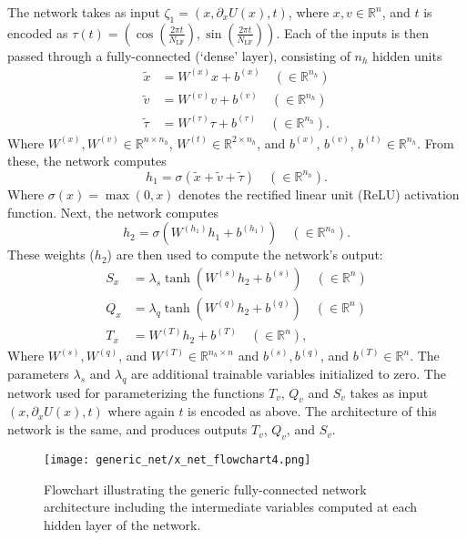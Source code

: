 \documentclass[main.tex]{subfiles}
\begin{document}
The network takes as input $\zeta_1 = (x, \partial_{x} U(x), t)$, where $x, v \in \mathbb{R}^{n}$, and $t$ is encoded
as $\tau(t) = \left(\cos{(\frac{2\pi t}{N_{\mathrm{LF}}})},\right.  \left.\sin{(\frac{2\pi
t}{N_{\mathrm{LF}}})}\right)$.
%
Each of the inputs is then passed through a fully-connected (`dense' layer), consisting of $n_h$ hidden units
%
\begin{align}
    \tilde x &= W^{(x)} x + b^{(x)} \quad (\in \mathbb{R}^{n_h})\\
    \tilde v &= W^{(v)} v + b^{(v)} \quad (\in \mathbb{R}^{n_h})\\
    \tilde \tau &= W^{(\tau)} \tau + b^{(\tau)} \quad (\in \mathbb{R}^{n_h}).
\end{align}
%
Where $W^{(x)}, W^{(v)} \in \mathbb{R}^{n \times n_h}$, $W^{(t)} \in \mathbb{R}^{2 \times n_h}$, and $b^{(x)}$,
$b^{(v)}$,  $b^{(t)} \in \mathbb{R}^{n_h}$.
%
From these, the network computes
%
\begin{equation}
    h_1 = \sigma(\tilde x + \tilde v + \tilde \tau) \quad (\in
    \mathbb{R}^{n_h}).
    \label{eq:hidden_1}
\end{equation}
%
Where $\sigma(x) = \max(0, x)$ denotes the rectified linear unit (ReLU) activation function.
%
Next, the network computes
%
\begin{equation}
    h_2 = \sigma\left(W^{(h_1)} h_1 + b^{(h_1)}\right) \quad (\in
    \mathbb{R}^{n_h}).
    \label{eq:hidden_2}
\end{equation}
%
These weights ($h_2$) are then used to compute the network's output:
%
\begin{align}
    S_x &= \lambda_s \tanh(W^{(s)} h_2 + b^{(s)})\quad (\in \mathbb{R}^{n})\\
    Q_x &= \lambda_q \tanh(W^{(q)} h_2 + b^{(q)})\quad (\in \mathbb{R}^{n})\\
    T_x &= W^{(T)} h_2 + b^{(T)}\quad (\in \mathbb{R}^{n}),
\end{align}
%
Where $W^{(s)}, W^{(q)}$, and $W^{(T)} \in \mathbb{R}^{n_h \times n}$ and $b^{(s)}, b^{(q)}$, and $b^{(T)} \in
\mathbb{R}^{n}$.
%
The parameters $\lambda_s$ and $\lambda_q$ are additional trainable variables initialized to zero.
%
The network used for parameterizing the functions $T_v$, $Q_v$ and $S_v$ takes as input $(x, \partial_x U(x), t)$ where
again $t$ is encoded as above.  The architecture of this network is the same, and produces outputs $T_v$, $Q_v$, and
$S_v$.

\begin{figure}[htpb]
  \centering
  \texttt{[image: generic\_net/x\_net\_flowchart4.png]}
  \caption{Flowchart illustrating the generic fully-connected network architecture including the intermediate variables
  computed at each hidden layer of the network.}%
\label{fig:x_net_flowchart}
\end{figure}
\end{document}
